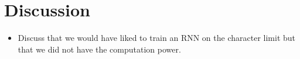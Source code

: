\section{Discussion} \label{sec:discussion} 

\begin{itemize}
    \item

        Discuss that we would have liked to train an RNN on the character limit
        but that we did not have the computation power.

\end{itemize}
